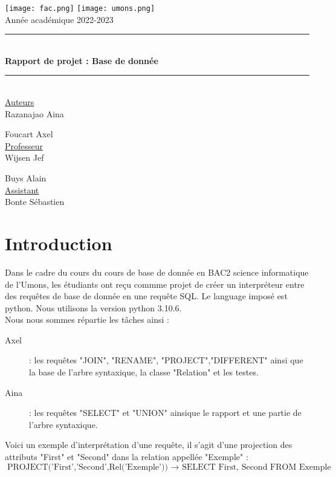 \documentclass[10pt,a4paper]{article}
\begin{document}
\begin{titlepage}
\newcommand{\HRule}{\rule{\linewidth}{0.5mm}}
\center

\texttt{[image: fac.png]}
\texttt{[image: umons.png]}
\\[3.0cm]
\large
Année académique 2022-2023
\HRule \\[0.4cm]
{ \huge \bfseries Rapport de projet : Base de donnée \\[0.2cm] }
\HRule \\[2.0cm]

\Large
\underline{Auteurs}
\\[0.2cm]
Razanajao Aina

Foucart Axel
\\[1.0cm]
\underline{Professeur}
\\[0.2cm]
Wijsen Jef

Buys Alain
\\[1.0cm]
\underline{Assistant}
\\[0.2cm]
Bonte Sébastien
\\[3.0cm]

\end{titlepage}


\LARGE
\tableofcontents

\newpage
\section{Introduction}
\normalsize
Dans le cadre du cours du cours de base de donnée en BAC2 science informatique de l'Umons, les étudiants ont reçu commme projet de créer un interpréteur entre des requêtes de base de donnée en une requête SQL. Le language imposé est python. Nous utilisons la version python 3.10.6.
\\[0.5cm]
Nous nous sommes répartie les tâches ainsi :
\begin{description}
\item[Axel] : les requêtes "JOIN", "RENAME", "PROJECT","DIFFERENT" ainsi que la base de l'arbre syntaxique, la classe "Relation" et les testes.
\item[Aina] : les requêtes "SELECT" et "UNION" ainsique le rapport et  une partie de l'arbre syntaxique.\\[0.1cm]
\end{description}


Voici un exemple d'interprétation d'une requête, il s'agit d'une projection des attributs "First" et "Second" dans la relation appellée "Exemple" :
\[
\text{PROJECT('First','Second',Rel('Exemple')) }\to \text{ SELECT First, Second FROM Exemple}
\]
\\
\end{document}

